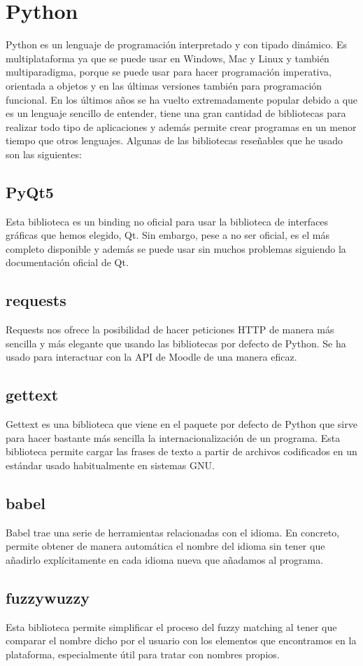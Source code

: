 \section{Python}
Python es un lenguaje de programación interpretado y con tipado dinámico. Es multiplataforma ya que se puede usar en Windows, Mac y Linux y también multiparadigma, porque se puede usar para hacer programación imperativa, orientada a objetos y en las últimas versiones también para programación funcional.
En los últimos años se ha vuelto extremadamente popular debido a que es un lenguaje sencillo de entender, tiene una gran cantidad de bibliotecas para realizar todo tipo de aplicaciones y además permite crear programas en un menor tiempo que otros lenguajes.
Algunas de las bibliotecas reseñables que he usado son las siguientes:
\subsection{PyQt5}
Esta biblioteca es un binding no oficial para usar la biblioteca de interfaces gráficas que hemos elegido, Qt. Sin embargo, pese a no ser oficial, es el más completo disponible y además se puede usar sin muchos problemas siguiendo la documentación oficial de Qt.
\subsection{requests}
Requests nos ofrece la posibilidad de hacer peticiones HTTP de manera más sencilla y más elegante que usando las bibliotecas por defecto de Python. Se ha usado para interactuar con la API de Moodle de una manera eficaz.
\subsection{gettext}
Gettext es una biblioteca que viene en el paquete por defecto de Python que sirve para hacer bastante más sencilla la internacionalización de un programa. Esta biblioteca permite cargar las frases de texto a partir de archivos codificados en un estándar usado habitualmente en sistemas GNU.
\subsection{babel}
Babel trae una serie de herramientas relacionadas con el idioma. En concreto, permite obtener de manera automática el nombre del idioma sin tener que añadirlo explícitamente en cada idioma nueva que añadamos al programa.
\subsection{fuzzywuzzy}
Esta biblioteca permite simplificar el proceso del fuzzy matching al tener que comparar el nombre dicho por el usuario con los elementos que encontramos en la plataforma, especialmente útil para tratar con nombres propios.


